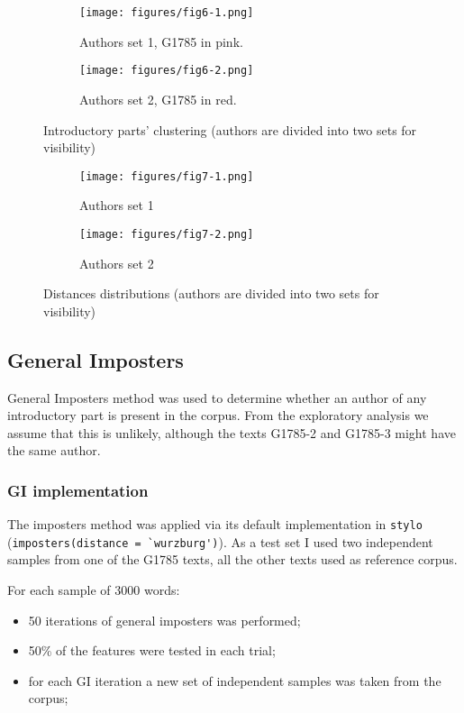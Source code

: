 \documentclass[12pt, letterpaper]{article}
\begin{document}
\begin{figure}
\begin{subfigure}{.5\textwidth}
  \centering
  \texttt{[image: figures/fig6-1.png]}
  \caption{Authors set 1, G1785 in pink.}
  \label{fig6:sub1}
\end{subfigure}%
\begin{subfigure}{.5\textwidth}
  \centering
  \texttt{[image: figures/fig6-2.png]}
  \caption{Authors set 2, G1785 in red.}
  \label{fig6:sub2}
\end{subfigure}
\caption{Introductory parts' clustering (authors are divided into two sets for visibility)}
\label{fig6}
\end{figure}

\begin{figure}
\begin{subfigure}{.5\textwidth}
  \centering
  \texttt{[image: figures/fig7-1.png]}
  \caption{Authors set 1}
\end{subfigure}%
\begin{subfigure}{.5\textwidth}
  \centering
  \texttt{[image: figures/fig7-2.png]}
  \caption{Authors set 2}
\end{subfigure}
\caption{Distances distributions (authors are divided into two sets for visibility)}
\label{fig7}
\end{figure}

\subsection{General Imposters}
General Imposters method was used to determine whether an author of any introductory part is present in the corpus. From the exploratory analysis we assume that this is unlikely, although the texts G1785-2 and G1785-3 might have the same author.

\subsubsection{GI implementation}
The imposters method was applied via its default implementation in \verb|stylo| (\verb|imposters(distance = `wurzburg')|). As a test set I used two independent samples from one of the G1785 texts, all the other texts used as reference corpus.

For each sample of 3000 words:
\begin{itemize}
    \item 50 iterations of general imposters was performed;
    \item 50\% of the features were tested in each trial;
    \item for each GI iteration a new set of independent samples was taken from the corpus;
\end{itemize}
\end{document}
